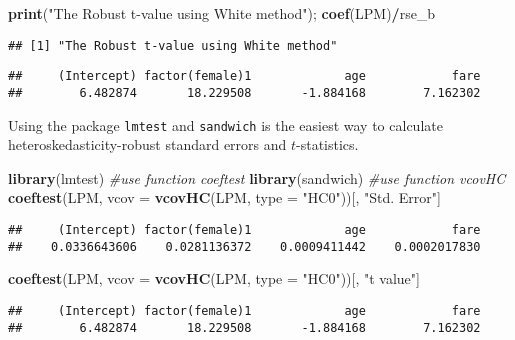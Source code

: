 \documentclass[
  12pt,
]{article}
\newenvironment{Shaded}{\begin{snugshade}}{\end{snugshade}}
\newcommand{\CommentTok}[1]{\textcolor[rgb]{0.56,0.35,0.01}{\textit{#1}}}
\newcommand{\DataTypeTok}[1]{\textcolor[rgb]{0.13,0.29,0.53}{#1}}
\newcommand{\KeywordTok}[1]{\textcolor[rgb]{0.13,0.29,0.53}{\textbf{#1}}}
\newcommand{\NormalTok}[1]{#1}
\newcommand{\OperatorTok}[1]{\textcolor[rgb]{0.81,0.36,0.00}{\textbf{#1}}}
\newcommand{\StringTok}[1]{\textcolor[rgb]{0.31,0.60,0.02}{#1}}
\begin{document}
\begin{Shaded}
\begin{Highlighting}[]
\KeywordTok{print}\NormalTok{(}\StringTok{"The Robust t{-}value using White method"}\NormalTok{); }\KeywordTok{coef}\NormalTok{(LPM)}\OperatorTok{/}\NormalTok{rse\_b}
\end{Highlighting}
\end{Shaded}

\begin{verbatim}
## [1] "The Robust t-value using White method"
\end{verbatim}

\begin{verbatim}
##     (Intercept) factor(female)1             age            fare 
##        6.482874       18.229508       -1.884168        7.162302
\end{verbatim}

Using the package \texttt{lmtest} and \texttt{sandwich} is the easiest
way to calculate heteroskedasticity-robust standard errors and
\(t\)-statistics.

\begin{Shaded}
\begin{Highlighting}[]
\KeywordTok{library}\NormalTok{(lmtest) }\CommentTok{\#use function \textasciigrave{}coeftest\textasciigrave{}}
\KeywordTok{library}\NormalTok{(sandwich) }\CommentTok{\#use function \textasciigrave{}vcovHC\textasciigrave{}}
\KeywordTok{coeftest}\NormalTok{(LPM, }\DataTypeTok{vcov =} \KeywordTok{vcovHC}\NormalTok{(LPM, }\DataTypeTok{type =} \StringTok{"HC0"}\NormalTok{))[, }\StringTok{"Std. Error"}\NormalTok{]}
\end{Highlighting}
\end{Shaded}

\begin{verbatim}
##     (Intercept) factor(female)1             age            fare 
##    0.0336643606    0.0281136372    0.0009411442    0.0002017830
\end{verbatim}

\begin{Shaded}
\begin{Highlighting}[]
\KeywordTok{coeftest}\NormalTok{(LPM, }\DataTypeTok{vcov =} \KeywordTok{vcovHC}\NormalTok{(LPM, }\DataTypeTok{type =} \StringTok{"HC0"}\NormalTok{))[, }\StringTok{"t value"}\NormalTok{]}
\end{Highlighting}
\end{Shaded}

\begin{verbatim}
##     (Intercept) factor(female)1             age            fare 
##        6.482874       18.229508       -1.884168        7.162302
\end{verbatim}
\end{document}
